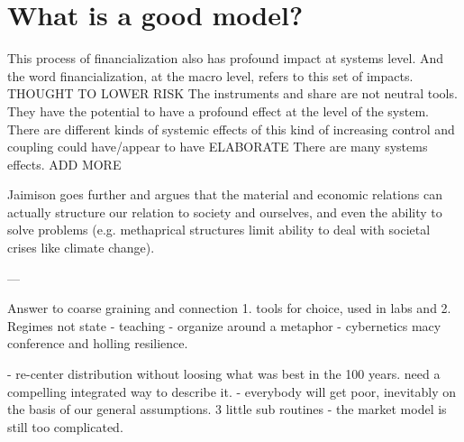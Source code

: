 


\section{What is a good model?}


This process of financialization also has profound impact at systems level. 
And the word financialization, at the macro level, refers to this set of impacts.
THOUGHT TO LOWER RISK  %
The instruments and share are not neutral tools. They have the potential to have a profound effect at the level of the system.
There are different kinds of systemic effects of this kind of increasing control and coupling could have/appear to have ELABORATE
There are many systems effects. ADD MORE 

Jaimison goes further and argues that the material and economic relations can actually structure our relation to society and ourselves, and even the ability to solve problems (e.g. methaprical structures limit ability to deal with societal crises like climate change).


---


Answer to coarse graining and connection
1. tools for choice, used in labs and
2. Regimes not state
- teaching 
- organize around a metaphor - cybernetics macy conference and holling resilience.

- re-center distribution without loosing what was best in the 100 years. need a compelling integrated way to describe it. 
- everybody will get poor, inevitably on the basis of our general assumptions.
3 little sub routines - the market model is still too complicated.



